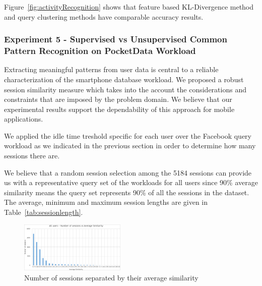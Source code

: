 Figure~\ref{fig:activityRecognition} shows that feature based KL-Divergence method and query clustering methods have comparable accuracy results. 



\subsubsection{Experiment 5 - Supervised vs Unsupervised Common Pattern Recognition on PocketData Workload}


Extracting meaningful patterns from user data is central to a reliable characterization of the smartphone database workload. We proposed a robust session similarity measure which takes into the account the considerations and constraints that are imposed by the problem domain. We believe that our experimental results support the dependability of this approach for mobile applications. 

We applied the idle time treshold specific for each user over the Facebook query workload as we indicated in the previous section in order to determine how many sessions there are. 

We believe that a random session selection among the 5184 sessions can provide us with a representative query set of the workloads for all users since 90\% average similarity means the query set represents 90\% of all the sessions in the dataset. The average, minimum and maximum session lengths are given in Table~\ref{tab:sessionlength}.

\begin{figure}[h!]
    \centering
    \includegraphics[width=0.45\textwidth]{graphics/allsessions}
    \caption{Number of sessions separated by their average similarity }
    \label{fig:averagesimilarity}
\end{figure}

